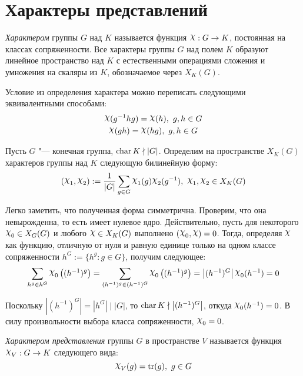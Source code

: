 \section{Характеры представлений}

\begin{definition}
	\textit{Характером} группы $G$ над $K$ называется функция $\Chi : G \to K$, постоянная на классах сопряженности. Все характеры группы $G$ над полем $K$ образуют линейное пространство над $K$ с естественными операциями сложения и умножения на скаляры из $K$, обозначаемое через $X_K(G)$.
\end{definition}

\begin{note}
	Условие из определения характера можно переписать следующими эквивалентными способами:
	\begin{gather*}
		\Chi(g^{-1}hg) = \Chi(h),~g, h \in G\\
		\Chi(gh) = \Chi(hg),~g, h \in G
	\end{gather*}
\end{note}

\begin{note}
	Пусть $G$ "--- конечная группа, $\operatorname{char} K \nmid |G|$. Определим на пространстве $X_K(G)$ характеров группы над $K$ следующую билинейную форму:
	\[(\Chi_1, \Chi_2) := \frac1{|G|}\sum_{g \in G}\Chi_1(g)\Chi_2(g^{-1}),~\Chi_1, \Chi_2 \in X_K(G)\]
	
	Легко заметить, что полученная форма симметрична. Проверим, что она невырожденна, то есть имеет нулевое ядро. Действительно, пусть для некоторого $\Chi_0 \in X_G(G)$ и любого $\Chi \in X_K(G)$ выполнено $(\Chi_0, \Chi) = 0$. Тогда, определяя $\Chi$ как функцию, отличную от нуля и равную единице только на одном классе сопряженности $h^G := \{h^g : g \in G\}$, получим следующее:
	\[\sum_{h^g \in h^G}\Chi_0\left((h^{-1})^g\right) = \sum_{(h^{-1})^g \in (h^{-1})^G}\Chi_0\left((h^{-1})^g\right) = \left|(h^{-1})^G\right| \Chi_0(h^{-1}) = 0\]
	
	Поскольку $\left|(h^{-1})^G\right| = \left|h^G\right| \mid |G|$, то $\operatorname{char} K \nmid \left|(h^{-1})^G\right|$, откуда $\Chi_0(h^{-1}) = 0$. В силу произвольности выбора класса сопряженности, $\Chi_0 = 0$.
\end{note}

\begin{definition}
	\textit{Характером представления} группы $G$ в пространстве $V$ называется функция $\Chi_V: G \to K$ следующего вида:
	\[\Chi_V(g) = \tr(g),~g \in G\]
\end{definition}

